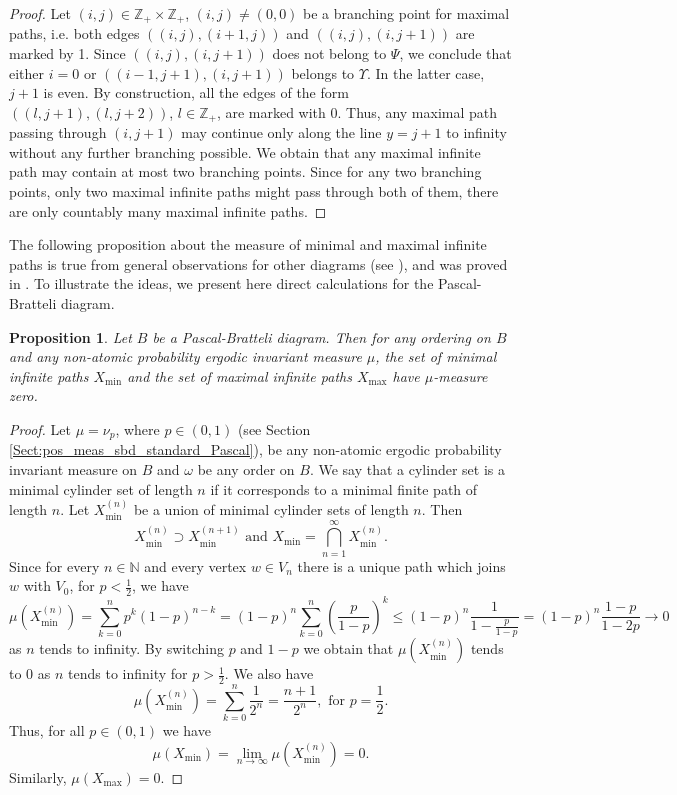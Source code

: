 \documentclass[11pt, twoside]{amsart}
\theoremstyle{definition}
\theoremstyle{remark}
\theoremstyle{plain}
\newtheorem{prop}[definition]{Proposition}
\numberwithin{equation}{section}
\begin{document}
\begin{proof}
    Let $(i,j)\in\mathbb Z_+\times\mathbb Z_+$, $(i,j)\neq (0,0)$ be a branching point for maximal paths, i.e. both edges $((i,j),(i+1,j))$ and $((i,j),(i,j+1))$ are marked by 1. Since $((i,j),(i,j+1))$ does not belong to $\Psi$, we conclude that either $i=0$ or $((i-1,j+1),(i,j+1))$ belongs to $\Upsilon$. In the latter case, $j+1$ is even. By construction, all the edges of the form $((l,j+1),(l,j+2))$, $l\in \mathbb Z_+$, are marked with 0. Thus, any maximal path passing through $(i,j+1)$ may continue only along the line $y=j+1$ to infinity without any further branching possible. We obtain that any maximal infinite path may contain at most two branching points. Since for any two branching points, only two maximal infinite paths might pass through both of them, there are only countably many maximal infinite paths.
\end{proof}

The following proposition about the measure of minimal and maximal infinite paths is true from general observations for other diagrams (see \cite[Lemma 2.7]{BezuglyiKwiatkowskiMedynetsSolomyak2010}), and was proved in \cite[Proposition 2.1]{Fricketal2017}. To illustrate the ideas, we present here direct calculations for the Pascal-Bratteli diagram. 
\begin{prop}
    Let $B$ be a Pascal-Bratteli diagram. Then for any ordering on $B$ and any non-atomic probability ergodic invariant measure $\mu$, the set of minimal infinite paths $X_{\min}$ and the set of maximal infinite paths $X_{\max}$ have $\mu$-measure zero.
\end{prop}

\begin{proof}
    Let $\mu = \nu_p$, where $p \in (0,1)$ (see Section \ref{Sect:pos_meas_sbd_standard_Pascal}), be any non-atomic ergodic probability invariant measure on $B$ and $\omega$ be any order on $B$. 
    We say that a cylinder set is a minimal cylinder set of length $n$ if it corresponds to a minimal finite path of length $n$. Let $X_{\min}^{(n)}$ be a union of minimal cylinder sets of length $n$. Then 
    $$
    X_{\min}^{(n)} \supset X_{\min}^{(n+1)} \mbox{ and } X_{\min} = \bigcap_{n = 1}^{\infty} X_{\min}^{(n)}.
    $$
    Since for every $n \in \mathbb{N}$ and every vertex $w \in V_n$ there is a unique path which joins $w$ with $V_0$, for $p < \frac{1}{2}$, we have
    $$
    \mu(X_{\min}^{(n)}) = \sum_{k = 0}^{n} p^k(1-p)^{n-k} = (1 - p)^n \sum_{k = 0}^{n}\left(\frac{p}{1-p}\right)^{k} \leq (1 - p)^n \frac{1}{1 - \frac{p}{1-p}} = (1 - p)^n\frac{1-p}{1 - 2p} \rightarrow 0
    $$
    as $n$ tends to infinity. By switching $p$ and $1 - p$  we obtain that $\mu(X_{\min}^{(n)})$ tends to $0$ as $n$ tends to infinity for $p > \frac{1}{2}$.
    We also have
    $$
    \mu(X_{\min}^{(n)}) = \sum_{k = 0}^{n} \frac{1}{2^n} = \frac{n+1}{2^n}, \text{ for } p = \frac{1}{2}.
    $$ 
    Thus, for all $p \in (0,1)$ we have
    $$
    \mu(X_{\min}) = \lim_{n \rightarrow \infty}\mu(X_{\min}^{(n)}) = 0. 
    $$
    Similarly, $\mu(X_{\max}) = 0$.
\end{proof}
\end{document}
